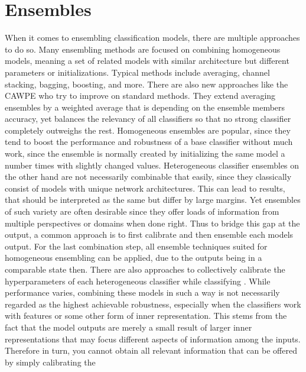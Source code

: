 \section{Ensembles}
\label{sec:ensembles}

When it comes to ensembling classification models, there are multiple approaches to do so. Many ensembling methods are focused on combining homogeneous 
models, meaning a set of related models with similar architecture but different parameters or initializations. Typical methods \cite{Opitz_1999ensemblebasics} include 
averaging, channel stacking, bagging, boosting, and more. There are also new approaches like the CAWPE \cite{Large_2019CAPE} who try to improve on standard methods. They extend averaging ensembles by 
a weighted average that is depending on the ensemble members accuracy, yet balances the relevancy of all classifiers so that no strong classifier completely outweighs the rest.\newline
Homogeneous ensembles are popular, since they tend to boost the performance and robustness of a base classifier without 
much work, since the ensemble is normally created by initializing the same model a number times with slightly changed values.
\newline
Heterogeneous classifier ensembles on the other hand are not necessarily combinable that easily, since they classically consist of models with 
unique network architectures. This can lead to results, that should be interpreted as the same but differ by large margins. Yet 
ensembles of such variety are often desirable since they offer loads of information from multiple perspectives or domains when done right. 
\newline
Thus to bridge this gap at the output, a common approach is to first calibrate \cite{Guo_2017_tempscalingetc} and then ensemble each models 
output. For the last combination step, all ensemble techniques suited for homogeneous ensembling can 
be applied, due to the outputs being in a comparable state then. There are also approaches to collectively calibrate the hyperparameters 
of each heterogeneous classifier while classifying \cite{Guo_2017_tempscalingetc}. While performance varies, combining 
these models in such a way is not necessarily regarded as the highest achievable robustness, especially when the classifiers work with features or some other form of inner representation. 
This stems from the fact that the model outputs are merely a small result of larger inner representations that may focus different aspects 
of information among the inputs. Therefore in turn, you cannot obtain all relevant information that can be offered by simply calibrating the 
